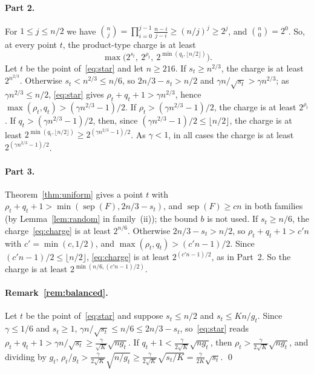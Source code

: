 \documentclass[11pt,a4paper]{article}
\theoremstyle{definition}
\theoremstyle{remark}
\newcommand{\sep}{\operatorname{sep}}
\begin{document}
\paragraph{Part 2.} For $1\le j\le n/2$ we have
$\binom nj=\prod_{i=0}^{j-1}\frac{n-i}{j-i}\ge(n/j)^j\ge2^j$, and $\binom n0=2^0$. So, at
every point $t$, the product-type charge is at least
\begin{equation}\label{eq:charge}
\max\bigl(2^{s_t},\ 2^{\rho_t},\ 2^{\min(q_t,\lfloor n/2\rfloor)}\bigr).
\end{equation}
Let $t$ be the point of~\eqref{eq:star} and let $n\ge216$. If $s_t\ge n^{2/3}$, the charge
is at least $2^{n^{2/3}}$. Otherwise $s_t<n^{2/3}\le n/6$, so $2n/3-s_t>n/2$ and
$\gamma n/\sqrt{s_t}>\gamma n^{2/3}$; as $\gamma n^{2/3}\le n/2$, \eqref{eq:star} gives
$\rho_t+q_t+1>\gamma n^{2/3}$, hence $\max(\rho_t,q_t)>(\gamma n^{2/3}-1)/2$. If
$\rho_t>(\gamma n^{2/3}-1)/2$, the charge is at least $2^{\rho_t}$. If
$q_t>(\gamma n^{2/3}-1)/2$, then, since $(\gamma n^{2/3}-1)/2\le\lfloor n/2\rfloor$, the
charge is at least $2^{\min(q_t,\lfloor n/2\rfloor)}\ge2^{(\gamma n^{2/3}-1)/2}$. As
$\gamma<1$, in all cases the charge is at least $2^{(\gamma n^{2/3}-1)/2}$.

\paragraph{Part 3.} Theorem~\ref{thm:uniform} gives a point $t$ with
$\rho_t+q_t+1>\min(\sep(F),2n/3-s_t)$, and $\sep(F)\ge cn$ in both families (by
Lemma~\ref{lem:random} in family~(ii)); the bound $b$ is not used. If $s_t\ge n/6$, the
charge~\eqref{eq:charge} is at least $2^{n/6}$. Otherwise $2n/3-s_t>n/2$, so
$\rho_t+q_t+1>c'n$ with $c'=\min(c,1/2)$, and $\max(\rho_t,q_t)>(c'n-1)/2$. Since
$(c'n-1)/2\le\lfloor n/2\rfloor$, \eqref{eq:charge} is at least $2^{(c'n-1)/2}$, as in
Part~2. So the charge is at least $2^{\min(n/6,(c'n-1)/2)}$.

\paragraph{Remark~\ref{rem:balanced}.} Let $t$ be the point of~\eqref{eq:star} and suppose
$s_t\le n/2$ and $s_t\le Kn/g_t$. Since $\gamma\le1/6$ and $s_t\ge1$,
$\gamma n/\sqrt{s_t}\le n/6\le2n/3-s_t$, so~\eqref{eq:star} reads
$\rho_t+q_t+1>\gamma n/\sqrt{s_t}\ge\frac{\gamma}{\sqrt K}\sqrt{ng_t}$. If
$q_t+1<\frac{\gamma}{2\sqrt K}\sqrt{ng_t}$, then
$\rho_t>\frac{\gamma}{2\sqrt K}\sqrt{ng_t}$, and dividing by $g_t$,
$\rho_t/g_t>\frac{\gamma}{2\sqrt K}\sqrt{n/g_t}\ge\frac{\gamma}{2\sqrt K}\sqrt{s_t/K}
=\frac{\gamma}{2K}\sqrt{s_t}$. \qed
\end{document}
